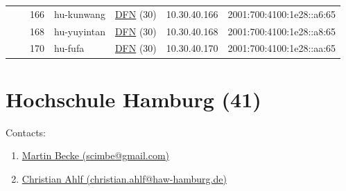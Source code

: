 \begin{small}
\begin{center}
\begin{longtable}{|c|c|c|c|c|c|c|c|}
  &  & \tiny{166} & \multicolumn{1}{|l|}{\tiny{hu-kunwang}} & \multicolumn{2}{|c|}{\tiny{\href{https://www.dfn.de}{DFN} (30)}} & \tiny{10.30.40.166} & \tiny{2001:700:4100:1e28::a6:65} \\* \cline{3-3}\cline{4-4}\cline{5-5}\cline{6-6}\cline{7-7}\cline{8-8}
  &  & \tiny{168} & \multicolumn{1}{|l|}{\tiny{hu-yuyintan}} & \multicolumn{2}{|c|}{\tiny{\href{https://www.dfn.de}{DFN} (30)}} & \tiny{10.30.40.168} & \tiny{2001:700:4100:1e28::a8:65} \\* \cline{3-3}\cline{4-4}\cline{5-5}\cline{6-6}\cline{7-7}\cline{8-8}
  &  & \tiny{170} & \multicolumn{1}{|l|}{\tiny{hu-fufa}} & \multicolumn{2}{|c|}{\tiny{\href{https://www.dfn.de}{DFN} (30)}} & \tiny{10.30.40.170} & \tiny{2001:700:4100:1e28::aa:65} \\ \hline
\end{longtable}
\end{center}
\end{small}



\section{Hochschule Hamburg (41)}
\label{sec:HAW}

Contacts:\begin{enumerate}
 \item {}\href{mailto:scimbe@gmail.com}{Martin Becke (scimbe@gmail.com)}
 \item {}\href{mailto:christian.ahlf@haw-hamburg.de}{Christian Ahlf (christian.ahlf@haw-hamburg.de)}
\end{enumerate}


